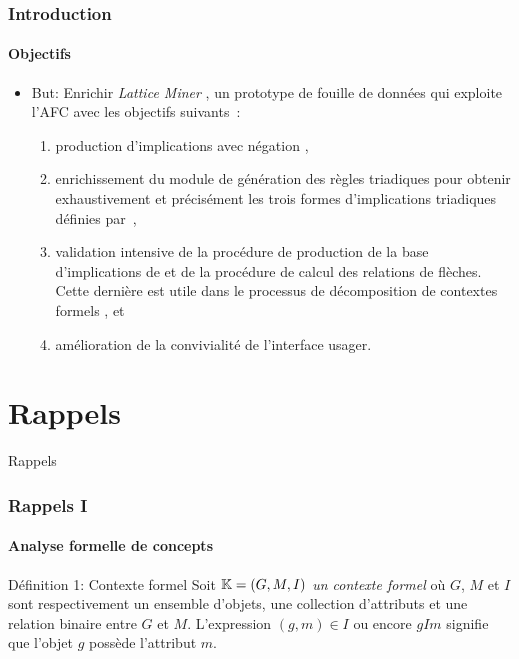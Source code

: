 \documentclass[french]{beamer}
\def\KK{\mathbb{K}}
\begin{document}
\begin{frame}
\frametitle{Introduction}
\framesubtitle{Objectifs}
\begin{itemize}
\item But: Enrichir \emph{Lattice Miner} \parencite{Roberge2007}, un prototype de fouille de données qui exploite l’AFC avec les objectifs suivants~:

\begin{enumerate}
\item production d’implications avec négation \parencite{Missaoui2012},
\item enrichissement du module de génération des règles triadiques pour obtenir exhaustivement et précisément les trois formes d’implications triadiques définies par~\parencite{Ganter2004},
\item validation intensive de la procédure de production de la base d’implications de \parencite{Guigues1986} et de la procédure de calcul des relations de flèches. Cette dernière est utile dans le processus de décomposition de contextes formels \parencite{Viaud2015}, et
\item amélioration de la convivialité de l'interface usager.
\end{enumerate}
\end{itemize}
\end{frame}

\section{Rappels}
\begin{frame}
\huge{\centerline{Rappels}}
\end{frame}

\begin{frame}
\frametitle{Rappels I}
\framesubtitle{Analyse formelle de concepts}
\begin{block}{Définition 1: Contexte formel}
Soit $\KK = \GMI$ \emph{un contexte formel} où $G$, $M$ et $I$ sont respectivement un ensemble d'objets, une collection d'attributs et une relation binaire entre $G$ et $M$. L'expression $(g,m) \in I$ ou encore $gIm$ signifie que l'objet $g$ possède l'attribut $m$.
\end{block}

\begin{table}[H]
\begin{center}
\begin{cxt}%
\cxtName{}%
%
%
%
%
%
%
\end{cxt}
\end{center}
\caption{Exemple de contexte \context}
\label{cap:context-simple}
\end{table}
\end{frame}
\end{document}
